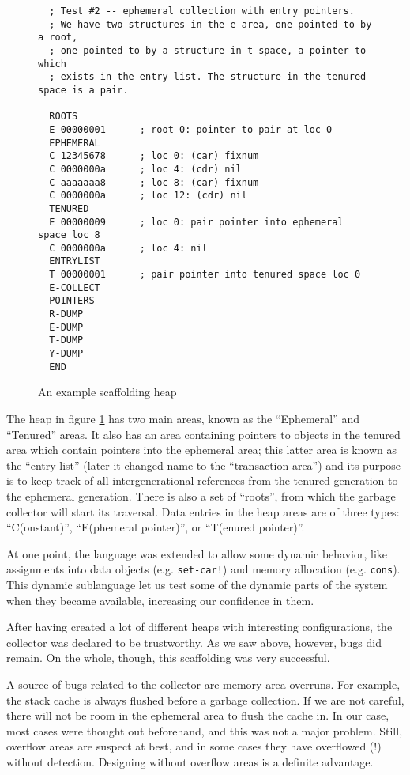 \begin{figure}[ht]
\begin{verbatim}
  ; Test #2 -- ephemeral collection with entry pointers.
  ; We have two structures in the e-area, one pointed to by a root, 
  ; one pointed to by a structure in t-space, a pointer to which 
  ; exists in the entry list. The structure in the tenured space is a pair.

  ROOTS
  E 00000001      ; root 0: pointer to pair at loc 0
  EPHEMERAL
  C 12345678      ; loc 0: (car) fixnum
  C 0000000a      ; loc 4: (cdr) nil
  C aaaaaaa8      ; loc 8: (car) fixnum
  C 0000000a      ; loc 12: (cdr) nil
  TENURED
  E 00000009      ; loc 0: pair pointer into ephemeral space loc 8
  C 0000000a      ; loc 4: nil
  ENTRYLIST
  T 00000001      ; pair pointer into tenured space loc 0
  E-COLLECT
  POINTERS
  R-DUMP
  E-DUMP
  T-DUMP
  Y-DUMP
  END
\end{verbatim}
\caption{An example scaffolding heap}
\label{heapfig}
\end{figure}

The heap in figure \ref{heapfig} has two main areas, known as the
``Ephemeral'' and ``Tenured'' areas. It also has an area containing pointers
to objects in the tenured area which contain pointers into the ephemeral
area; this latter area is known as the ``entry list'' (later it changed name
to the ``transaction area'') and its purpose is to keep track of all
intergenerational references from the tenured generation to the ephemeral
generation. There is also a set of ``roots'', from which the garbage
collector will start its traversal. Data entries in the heap areas are of
three types: ``C(onstant)'', ``E(phemeral pointer)'', or ``T(enured
pointer)''.

At one point, the language was extended to allow some dynamic behavior, like
assignments into data objects (e.g. {\tt set-car!}) and memory allocation
(e.g. {\tt cons}). This dynamic sublanguage let us test some of the dynamic
parts of the system when they became available, increasing our confidence in
them.

After having created a lot of different heaps with interesting configurations,
the collector was declared to be trustworthy. As we saw above, however,
bugs did remain. On the whole, though, this scaffolding was very successful.

A source of bugs related to the collector are memory area overruns. For
example, the stack cache is always flushed before a garbage collection.  If
we are not careful, there will not be room in the ephemeral area to flush
the cache in. In our case, most cases were thought out beforehand, and this
was not a major problem.  Still, overflow areas are suspect at best, and in
some cases they have overflowed (!) without detection. Designing without
overflow areas is a definite advantage.

